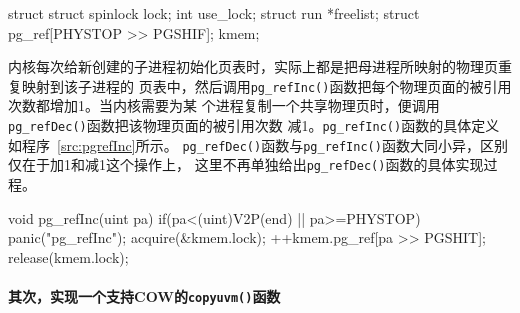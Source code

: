 \documentclass{swfuthesism}
\begin{document}
\begin{listing}%
  \begin{codeblock}
\begin{ccode}
struct {
  struct spinlock lock;
  int use_lock;
  struct run *freelist;
  struct pg_ref[PHYSTOP >> PGSHIF];
} kmem;
\end{ccode}
  \end{codeblock}
  \label{src:kmem2}
\end{listing}

内核每次给新创建的子进程初始化页表时，实际上都是把母进程所映射的物理页重复映射到该子进程的
页表中，然后调用\texttt{pg\_refInc()}函数把每个物理页面的被引用次数都增加1。当内核需要为某
个进程复制一个共享物理页时，便调用\texttt{pg\_refDec()}函数把该物理页面的被引用次数
减1。\texttt{pg\_refInc()}函数的具体定义如程序~\ref{src:pgrefInc}所示。
\texttt{pg\_refDec()}函数与\texttt{pg\_refInc()}函数大同小异，区别仅在于加1和减1这个操作上，
这里不再单独给出\texttt{pg\_refDec()}函数的具体实现过程。

\begin{listing}%
  \begin{codeblock}
\begin{ccode}
void pg_refInc(uint pa) {
  if(pa<(uint)V2P(end) || pa>=PHYSTOP)
    panic("pg_refInc");
  acquire(&kmem.lock);
  ++kmem.pg_ref[pa >> PGSHIT];
  release(kmem.lock);
}
\end{ccode}
  \end{codeblock}
  \label{src:pgrefInc}
\end{listing}


\paragraph{其次，实现一个支持COW的\texttt{copyuvm()}函数}
\end{document}
